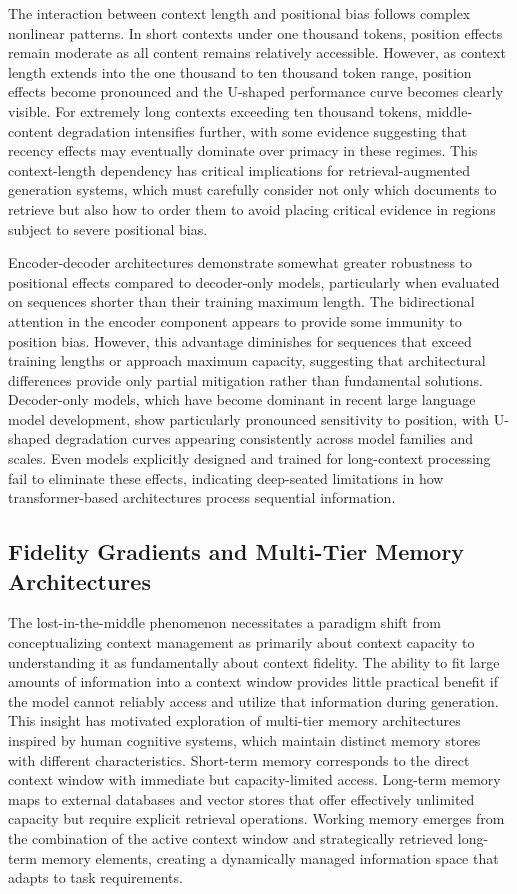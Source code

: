 \documentclass[11pt,letterpaper]{article}
\begin{document}
The interaction between context length and positional bias follows complex nonlinear patterns. In short contexts under one thousand tokens, position effects remain moderate as all content remains relatively accessible. However, as context length extends into the one thousand to ten thousand token range, position effects become pronounced and the U-shaped performance curve becomes clearly visible. For extremely long contexts exceeding ten thousand tokens, middle-content degradation intensifies further, with some evidence suggesting that recency effects may eventually dominate over primacy in these regimes. This context-length dependency has critical implications for retrieval-augmented generation systems, which must carefully consider not only which documents to retrieve but also how to order them to avoid placing critical evidence in regions subject to severe positional bias.

Encoder-decoder architectures demonstrate somewhat greater robustness to positional effects compared to decoder-only models, particularly when evaluated on sequences shorter than their training maximum length. The bidirectional attention in the encoder component appears to provide some immunity to position bias. However, this advantage diminishes for sequences that exceed training lengths or approach maximum capacity, suggesting that architectural differences provide only partial mitigation rather than fundamental solutions. Decoder-only models, which have become dominant in recent large language model development, show particularly pronounced sensitivity to position, with U-shaped degradation curves appearing consistently across model families and scales. Even models explicitly designed and trained for long-context processing fail to eliminate these effects, indicating deep-seated limitations in how transformer-based architectures process sequential information.

\subsection{Fidelity Gradients and Multi-Tier Memory Architectures}

The lost-in-the-middle phenomenon necessitates a paradigm shift from conceptualizing context management as primarily about context capacity to understanding it as fundamentally about context fidelity. The ability to fit large amounts of information into a context window provides little practical benefit if the model cannot reliably access and utilize that information during generation. This insight has motivated exploration of multi-tier memory architectures inspired by human cognitive systems, which maintain distinct memory stores with different characteristics. Short-term memory corresponds to the direct context window with immediate but capacity-limited access. Long-term memory maps to external databases and vector stores that offer effectively unlimited capacity but require explicit retrieval operations. Working memory emerges from the combination of the active context window and strategically retrieved long-term memory elements, creating a dynamically managed information space that adapts to task requirements.
\end{document}
